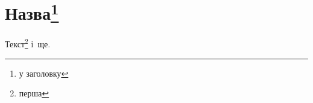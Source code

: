 \documentclass{kpi-thesis}
\begin{document}
\section{Назва\protect\footnote{у заголовку}}
Текст\footnote{перша} і\footnotemark\ ще.
\end{document}
